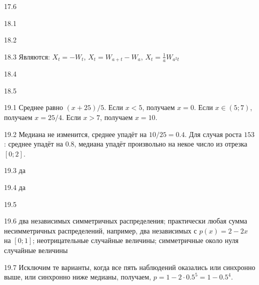 \protect \hypertarget {soln:17.6}{}
\begin{solution}{{17.6}}
\end{solution}
\protect \hypertarget {soln:18.1}{}
\begin{solution}{{18.1}}
\end{solution}
\protect \hypertarget {soln:18.2}{}
\begin{solution}{{18.2}}
\end{solution}
\protect \hypertarget {soln:18.3}{}
\begin{solution}{{18.3}}
Являются: $X_{t}=-W_{t}$, $X_{t}=W_{a+t}-W_{a}$, $X_{t}=\frac{1}{a}W_{a^{2}t}$
\end{solution}
\protect \hypertarget {soln:18.4}{}
\begin{solution}{{18.4}}
\end{solution}
\protect \hypertarget {soln:18.5}{}
\begin{solution}{{18.5}}
\end{solution}
\protect \hypertarget {soln:19.1}{}
\begin{solution}{{19.1}}
Среднее равно $(x+25)/5$. Если $x<5$, получаем $x=0$. Если $x \in (5; 7)$, получаем $x=25/4$. Если $x>7$, получаем $x=10$.
\end{solution}
\protect \hypertarget {soln:19.2}{}
\begin{solution}{{19.2}}
Медиана не изменится, среднее упадёт на $10/25=0.4$. Для случая роста $153$: среднее упадёт на $0.8$, медиана упадёт произвольно на некое число из отрезка $[0;2]$.
\end{solution}
\protect \hypertarget {soln:19.3}{}
\begin{solution}{{19.3}}
  да
\end{solution}
\protect \hypertarget {soln:19.4}{}
\begin{solution}{{19.4}}
да
\end{solution}
\protect \hypertarget {soln:19.5}{}
\begin{solution}{{19.5}}
\end{solution}
\protect \hypertarget {soln:19.6}{}
\begin{solution}{{19.6}}
  два независимых симметричных распределения; практически любая сумма несимметричных распределений, например, два независимых с $p(x)=2-2x$ на $[0;1]$; неотрицательные случайные величины; симметричные около нуля случайные величины
\end{solution}
\protect \hypertarget {soln:19.7}{}
\begin{solution}{{19.7}}
  Исключим те варианты, когда все пять наблюдений оказались или синхронно выше, или синхронно ниже медианы, получаем, $p=1-2\cdot 0.5^5=1-0.5^4$.
\end{solution}
